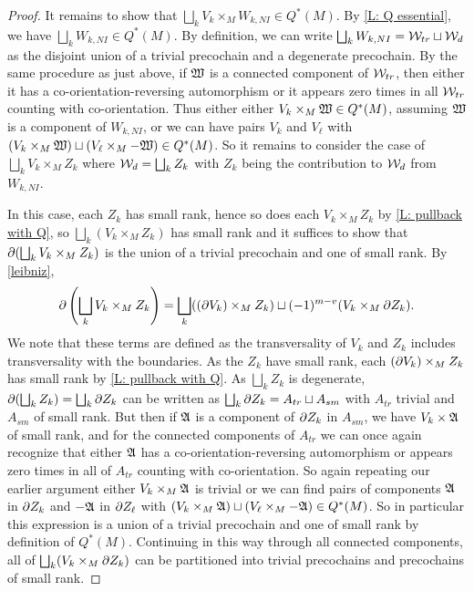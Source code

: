 \begin{proof}
	It remains to show that $\bigsqcup_k V_k \times_M W_{k,NI} \in Q^*(M)$.
	By \cref{L: Q essential}, we have $\bigsqcup_k W_{k,NI} \in Q^*(M)$.
	By definition, we can write $\bigsqcup_k W_{k,NI} = \mathcal{W}_{tr} \sqcup \mathcal{W}_{d}$ as the disjoint union of a trivial precochain and a degenerate precochain.
	By the same procedure as just above, if $\mathfrak W$ is a connected component of $\mathcal{W}_{tr}$, then either it has a co-orientation-reversing automorphism or it appears zero times in all $\mathcal{W}_{tr}$ counting with co-orientation.
	Thus either either $V_k \times_M \mathfrak W \in Q^*(M)$, assuming $\mathfrak W$ is a component of $W_{k,NI}$, or we can have pairs $V_k$ and $V_\ell$ with $(V_k \times_M \mathfrak W) \sqcup (V_\ell \times_M -\mathfrak W) \in Q^*(M)$.
	So it remains to consider the case of $\bigsqcup_k V_k \times_M Z_k$ where $\mathcal{W}_d = \bigsqcup_k Z_k$ with $Z_k$ being the contribution to $\mathcal{W}_d$ from $W_{k,NI}$.

	In this case, each $Z_k$ has small rank, hence so does each $V_k \times_M Z_k$ by \cref{L: pullback with Q}, so $\bigsqcup_k (V_k \times_M Z_k)$ has small rank and it suffices to show that $\partial (\bigsqcup_k V_k \times_M Z_k)$ is the union of a trivial precochain and one of small rank.
	By \cref{leibniz},
	$$\partial \left(\bigsqcup_k V_k \times_M Z_k\right) = \bigsqcup_k ((\partial V_k) \times_M Z_k ) \sqcup (-1)^{m-v} (V_k \times_M \partial Z_k).$$
	We note that these terms are defined as the transversality of $V_k$ and $Z_k$ includes transversality with the boundaries.
	As the $Z_k$ have small rank, each $(\partial V_k) \times_M Z_k$ has small rank by \cref{L: pullback with Q}.
	As $\bigsqcup_k Z_k$ is degenerate, $\partial (\bigsqcup_k Z_k) = \bigsqcup_k \partial Z_k$ can be written as $\bigsqcup_k\partial Z_k = A_{tr} \sqcup A_{sm}$ with $A_{tr}$ trivial and $A_{sm}$ of small rank.
	But then if $\mathfrak A$ is a component of $\partial Z_k$ in $A_{sm}$, we have $V_k \times \mathfrak A$ of small rank, and for the connected components of $A_{tr}$ we can once again recognize that either $\mathfrak A$ has a co-orientation-reversing automorphism or appears zero times in all of $A_{tr}$ counting with co-orientation.
	So again repeating our earlier argument either $V_k \times_M \mathfrak A$ is trivial or we can find pairs of components $\mathfrak A$ in $\partial Z_k$ and $-\mathfrak A$ in $\partial Z_\ell$ with $(V_k \times_M \mathfrak A) \sqcup (V_\ell \times_M -\mathfrak A) \in Q^*(M)$.
	So in particular this expression is a union of a trivial precochain and one of small rank by definition of $Q^*(M)$.
	Continuing in this way through all connected components, all of $\bigsqcup_k(V_k \times_M \partial Z_k)$ can be partitioned into trivial precochains and precochains of small rank.
\end{proof}

